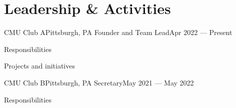 \section{Leadership \& Activities}
\resumeSectionStart

    \resumeSubheading
        {CMU Club A}{Pittsburgh, PA}
        {Founder and Team Lead}{Apr 2022 --- Present}
    
    \resumeItemListStart
        \item Responsibilities
        \item Projects and initiatives
    \resumeItemListEnd

    \resumeSubheading
        {CMU Club B}{Pittsburgh, PA}
        {Secretary}{May 2021 --- May 2022}

    \resumeItemListStart
        \item Responsibilities
    \resumeItemListEnd

\resumeSectionEnd
